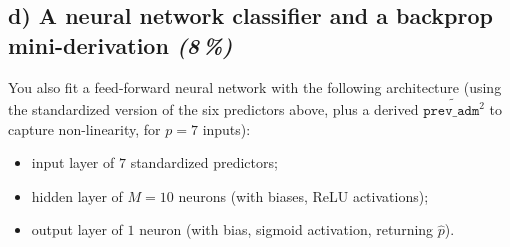 \documentclass[11pt,a4paper]{article}
\newcommand{\subpoints}[1]{\textit{(#1\,\%)}}
\begin{document}
\subsection*{d) A neural network classifier and a backprop mini-derivation \subpoints{8}}

You also fit a feed-forward neural network with the following architecture (using the standardized version of the six predictors above, plus a derived $\widetilde{\texttt{prev\_adm}^2}$ to capture non-linearity, for $p = 7$ inputs):
\begin{itemize}
  \item input layer of $7$ standardized predictors;
  \item hidden layer of $M = 10$ neurons (with biases, ReLU activations);
  \item output layer of $1$ neuron (with bias, sigmoid activation, returning $\hat p$).
\end{itemize}
\end{document}
